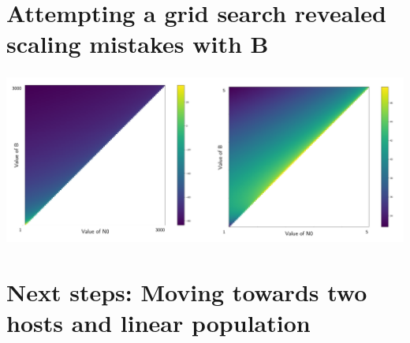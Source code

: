 \documentclass[aspectratio=169]{beamer}
\begin{document}
\section{Attempting a grid search revealed scaling mistakes with B}

\begin{frame} \frametitle{\insertsection}

    \centering\includegraphics[width=\textwidth]{images/grid-search-results}

\end{frame}

\section{Next steps: Moving towards two hosts and linear population}
\end{document}
